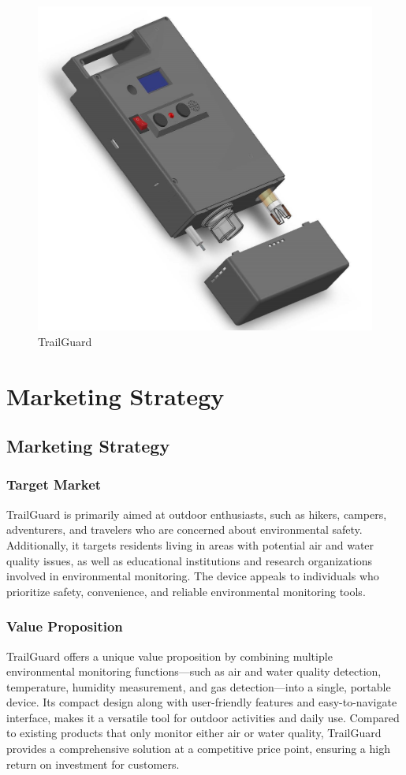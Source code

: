 \documentclass[a4paper,11pt]{article}%
\begin{document}
\begin{figure}[!h]
    \centering
    \includegraphics[scale=0.55]{./figures/FinalProduct.jpg}
    \caption{TrailGuard}
\end{figure}
\newpage
\section{Marketing Strategy}
\subsection{Marketing Strategy}
\subsubsection{Target Market}
TrailGuard is primarily aimed at outdoor enthusiasts, such as hikers, campers, adventurers, and travelers who are concerned about environmental safety. Additionally, it targets residents living in areas with potential air and water quality issues, as well as educational institutions and research organizations involved in environmental monitoring. The device appeals to individuals who prioritize safety, convenience, and reliable environmental monitoring tools.

\subsubsection{Value Proposition}
TrailGuard offers a unique value proposition by combining multiple environmental monitoring functions—such as air and water quality detection, temperature, humidity measurement, and gas detection—into a single, portable device. Its compact design along with user-friendly features and easy-to-navigate interface, makes it a versatile tool for outdoor activities and daily use. Compared to existing products that only monitor either air or water quality, TrailGuard provides a comprehensive solution at a competitive price point, ensuring a high return on investment for customers.
\end{document}
